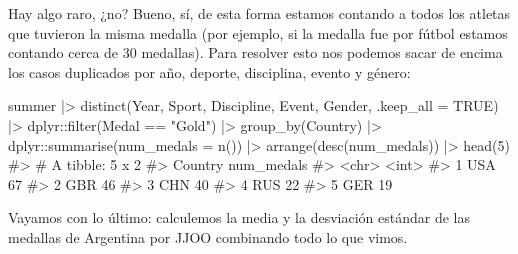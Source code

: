 \documentclass[
  letterpaper,
  DIV=11,
  numbers=noendperiod,
  oneside]{scrreprt}
\newenvironment{Shaded}{\begin{snugshade}}{\end{snugshade}}
\newcommand{\AttributeTok}[1]{\textcolor[rgb]{0.40,0.45,0.13}{#1}}
\newcommand{\CommentTok}[1]{\textcolor[rgb]{0.37,0.37,0.37}{#1}}
\newcommand{\ConstantTok}[1]{\textcolor[rgb]{0.56,0.35,0.01}{#1}}
\newcommand{\DecValTok}[1]{\textcolor[rgb]{0.68,0.00,0.00}{#1}}
\newcommand{\FunctionTok}[1]{\textcolor[rgb]{0.28,0.35,0.67}{#1}}
\newcommand{\NormalTok}[1]{\textcolor[rgb]{0.00,0.23,0.31}{#1}}
\newcommand{\SpecialCharTok}[1]{\textcolor[rgb]{0.37,0.37,0.37}{#1}}
\newcommand{\StringTok}[1]{\textcolor[rgb]{0.13,0.47,0.30}{#1}}
\begin{document}
Hay algo raro, ¿no? Bueno, sí, de esta forma estamos contando a todos
los atletas que tuvieron la misma medalla (por ejemplo, si la medalla
fue por fútbol estamos contando cerca de 30 medallas). Para resolver
esto nos podemos sacar de encima los casos duplicados por año, deporte,
disciplina, evento y género:

\begin{Shaded}
\begin{Highlighting}[]
\NormalTok{summer }\SpecialCharTok{|\textgreater{}} 
  \FunctionTok{distinct}\NormalTok{(Year, Sport, Discipline, Event, Gender, }\AttributeTok{.keep\_all =} \ConstantTok{TRUE}\NormalTok{) }\SpecialCharTok{|\textgreater{}}
\NormalTok{  dplyr}\SpecialCharTok{::}\FunctionTok{filter}\NormalTok{(Medal }\SpecialCharTok{==} \StringTok{"Gold"}\NormalTok{) }\SpecialCharTok{|\textgreater{}}
  \FunctionTok{group\_by}\NormalTok{(Country) }\SpecialCharTok{|\textgreater{}}
\NormalTok{  dplyr}\SpecialCharTok{::}\FunctionTok{summarise}\NormalTok{(}\AttributeTok{num\_medals =} \FunctionTok{n}\NormalTok{()) }\SpecialCharTok{|\textgreater{}}
  \FunctionTok{arrange}\NormalTok{(}\FunctionTok{desc}\NormalTok{(num\_medals)) }\SpecialCharTok{|\textgreater{}}
  \FunctionTok{head}\NormalTok{(}\DecValTok{5}\NormalTok{)}
\CommentTok{\#\textgreater{} \# A tibble: 5 x 2}
\CommentTok{\#\textgreater{}   Country num\_medals}
\CommentTok{\#\textgreater{}   \textless{}chr\textgreater{}        \textless{}int\textgreater{}}
\CommentTok{\#\textgreater{} 1 USA             67}
\CommentTok{\#\textgreater{} 2 GBR             46}
\CommentTok{\#\textgreater{} 3 CHN             40}
\CommentTok{\#\textgreater{} 4 RUS             22}
\CommentTok{\#\textgreater{} 5 GER             19}
\end{Highlighting}
\end{Shaded}

Vayamos con lo último: calculemos la media y la desviación estándar de
las medallas de Argentina por JJOO combinando todo lo que vimos.
\end{document}
